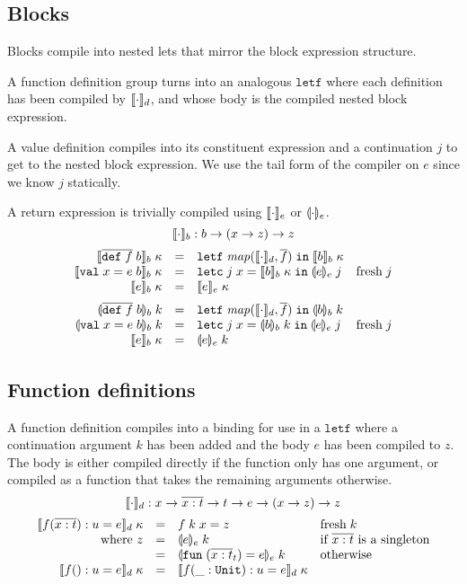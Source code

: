 \documentclass[11pt]{article}
\newcommand{\kw}[1]{\mathtt{#1}}
\begin{document}
\subsection*{Blocks}

Blocks compile into nested lets that mirror the block expression structure.

A function definition group turns into an analogous $\kw{letf}$ where each definition has been compiled by $\llbracket \cdot \rrbracket_d$, and whose body is the compiled nested block expression.

A value definition compiles into its constituent expression and a continuation $j$ to get to the nested block expression.
We use the tail form of the compiler on $e$ since we know $j$ statically.

A return expression is trivially compiled using $\llbracket \cdot \rrbracket_e$ or $\llparenthesis \cdot \rrparenthesis_e$.
\[
    \llbracket \cdot \rrbracket_b : b -> (x -> z) -> z
\]
\[
\begin{array}{rcll}
\cmpk{b}{\fundef{f}{b}} & = &
  \letff{\map{\cmpn{d}}{\repo{f}}}{\cmpk{b}{b}} \\
\cmpk{b}{\valdef{x}{e}{b}} & = &
  \letc{j}{x}{\cmpk{b}{b}}{\tcmpin{e}{e}{j}} & \fresh{j} \\
\cmpk{b}{\return{e}} & = &
  \cmpk{e}{e} \medskip \\

\tcmpk{b}{\fundef{f}{b}} & = &
  \letff{\map{\cmpn{d}}{\repo{f}}}{\tcmpk{b}{b}} \\
\tcmpk{b}{\valdef{x}{e}{b}} & = &
  \letc{j}{x}{\tcmpk{b}{b}}{\tcmpin{e}{e}{j}} & \fresh{j} \\
\cmpk{b}{\return{e}} & = &
  \tcmpk{e}{e} \\
\end{array}
\]

\subsection*{Function definitions}

A function definition compiles into a binding for use in a $\kw{letf}$ where a continuation argument $k$ has been added and the body $e$ has been compiled to $z$.
The body is either compiled directly if the function only has one argument, or compiled as a function that takes the remaining arguments otherwise.
\[
    \llbracket \cdot \rrbracket_d : x -> \overline{x : t} -> t -> e -> (x -> z) -> z
\]
\[
\begin{array}{rcll}
\cmpk{d}{\fdo{f}{x}{t}{u}{e}} & = &
  \defterm{f}{k}{x}{z} &
  \fresh{k} \\
\text{where $z$} & = &
  \tcmpk{e}{e} & \text{if $\repo{\arge{x}{t}}$ is a singleton} \\
 & = &
  \tcmpk{e}{\fune{\repo{\arge{x}{t}}_t}{e}} & \text{otherwise} \\
\cmpk{d}{\fde{f}{}{u}{e}} & = &
  \cmpk{d}{\fde{f}{\_ : \unity}{u}{e}}
\end{array}
\]
\end{document}
